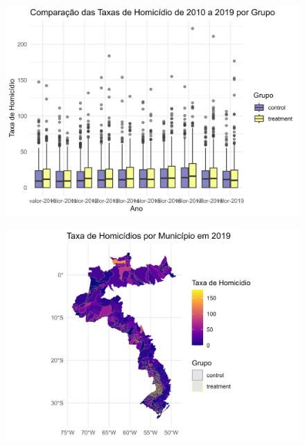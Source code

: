 \documentclass{beamer}
\begin{document}
\begin{frame}
	\begin{figure}
		\centering
		\includegraphics[width=1\linewidth]{figures/boxplot_hom}
		\label{fig:histoghom}
	\end{figure}
	
\end{frame}

\begin{frame}
	\begin{figure}
		\centering
		\includegraphics[width=1\linewidth]{figures/mapa_hom_2019}
		\label{fig:histoghom}
	\end{figure}
	
\end{frame}
\end{document}
